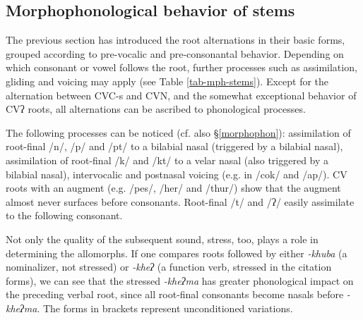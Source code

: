 \subsection{Morphophonological behavior of stems}\label{stem-2}

The previous section has introduced the root alternations in their basic forms, grouped according to pre-vocalic and pre-consonantal behavior. Depending on which consonant or vowel follows the root, further processes such as assimilation, gliding and voicing may apply (see Table \ref{tab-mph-stems}).  Except for the alternation between CVC-s and CVN, and the somewhat exceptional behavior of CVʔ roots, all alternations can be ascribed to phonological processes.

The following processes can be noticed (cf. also §\ref{morphophon}): assimilation of root-final /n/, /p/ and /pt/ to a bilabial nasal (triggered by a bilabial nasal), assimilation of root-final /k/ and /kt/ to  a velar nasal (also triggered by a bilabial nasal), intervocalic and postnasal voicing (e.g. in /cok/ and /ap/). CV roots with an augment (e.g. /pes/, /her/ and /thur/) show that the augment almost never surfaces before consonants. Root-final /t/ and /ʔ/ easily assimilate to the following consonant.

Not only the quality of the subsequent sound,  stress, too, plays a role in determining the allomorphs. If one compares roots followed by either \emph{-khuba} (a nominalizer, not stressed) or \emph{-kheʔ} (a function verb, stressed in the citation forms), we can see that the stressed \emph{-kheʔma} has greater phonological impact on the preceding verbal root, since all root-final consonants become nasals before \emph{-kheʔma}. The forms in brackets represent unconditioned variations.

